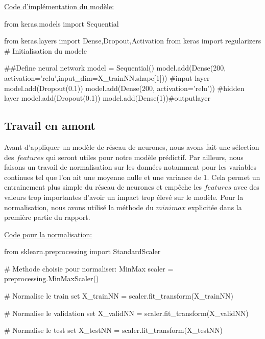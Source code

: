 \documentclass[a4paper,oneside,11pt]{article}
\begin{document}
\underline{Code d'implémentation du modèle:}
\begin{code-Python}
from keras.models import Sequential

from keras.layers import Dense,Dropout,Activation
from keras import regularizers
# Initialisation du modele

##Define neural network
model = Sequential()
model.add(Dense(200, activation='relu',input_dim=X_trainNN.shape[1])) #input layer
model.add(Dropout(0.1))
model.add(Dense(200, activation='relu')) #hidden layer
model.add(Dropout(0.1))
model.add(Dense(1))#outputlayer
\end{code-Python}

\subsection*{Travail en amont}
%
\qquad Avant d'appliquer un modèle de réseau de neurones, nous avons fait une sélection des $features$ qui seront utiles pour notre modèle prédictif. \newline
Par ailleurs, nous faisons un travail de normalisation sur les données notamment pour les variables continues tel que l'on ait une moyenne nulle et une variance de 1. Cela permet un entrainement plus simple du réseau de neurones et empêche les $features$ avec des valeurs trop importantes d'avoir un impact trop élevé sur le modèle.\newline
Pour la normalisation, nous avons utilisé la méthode du $minimax$ explicitée dans la première partie du rapport. 

\underline{Code pour la normalisation:}
\begin{code-Python}
from sklearn.preprocessing import StandardScaler

# Methode choisie pour normaliser: MinMax
scaler = preprocessing.MinMaxScaler()

# Normalise le train set
X_trainNN = scaler.fit_transform(X_trainNN)

# Normalise le validation set
X_validNN = scaler.fit_transform(X_validNN)

# Normalise le test set
X_testNN = scaler.fit_transform(X_testNN)
\end{code-Python}
\end{document}
